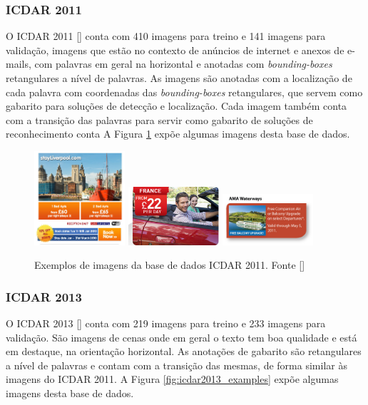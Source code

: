\subsubsection{ICDAR 2011}\label{sec:datasets_icdar2011}
O ICDAR 2011 [] conta com 410 imagens para treino e 141 imagens para validação, imagens que estão no contexto de anúncios de internet e anexos de e-mails, com palavras em geral na horizontal e anotadas com \textit{bounding-boxes} retangulares a nível de palavras. As imagens são anotadas com a localização de cada palavra com coordenadas das \textit{bounding-boxes} retangulares, que servem como gabarito para soluções de detecção e localização. Cada imagem também conta com a transição das palavras para servir como gabarito de soluções de reconhecimento conta A Figura \ref{fig:icdar2011_examples} expõe algumas imagens desta base de dados.

\begin{figure}
    \centering
    \includegraphics[width=0.3\textwidth]{figs/img_33.png}
    \includegraphics[width=0.3\textwidth]{figs/img_62.jpg}
    \includegraphics[width=0.3\textwidth]{figs/img_13.jpg}
    \caption{Exemplos de imagens da base de dados ICDAR 2011. Fonte []}
        \label{fig:icdar2011_examples}
\end{figure}

\subsubsection{ICDAR 2013}\label{sec:datasets_icdar2013}
O ICDAR 2013 [] conta com 219 imagens para treino e 233 imagens para validação. São imagens de cenas onde em geral o texto tem boa qualidade e está em destaque, na orientação horizontal. As anotações de gabarito são retangulares a nível de palavras e contam com a transição das mesmas, de forma similar às imagens do ICDAR 2011. A Figura \ref{fig:icdar2013_examples} expõe algumas imagens desta base de dados.

